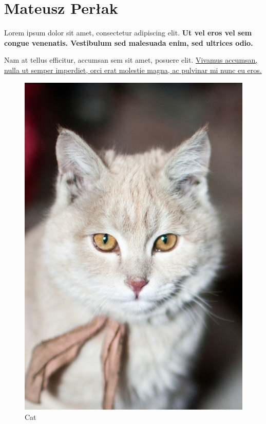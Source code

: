 \section{Mateusz Perłak}

\begin{center}
    Lorem ipsum dolor sit amet, consectetur adipiscing elit. \textbf{Ut vel eros vel sem congue venenatis. Vestibulum sed malesuada enim, sed ultrices odio.}\par
    Nam at tellus efficitur, accumsan sem sit amet, posuere elit. \underline{Vivamus accumsan, nulla ut semper imperdiet, orci erat molestie magna, ac pulvinar mi nunc eu eros.}
\end{center}

\begin{figure}[h]
    \centering
    \includegraphics[scale=0.2]{pictures/cat.png}
    \caption{Cat}
    \label{fig:cat}
\end{figure}


